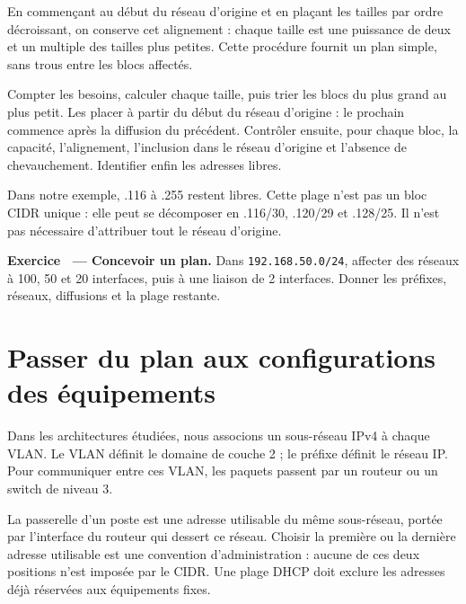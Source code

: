 \documentclass[11pt,a4paper]{article}
\newif\ifcorrige
\newcommand{\ip}[1]{\textcolor{ipred}{\texttt{#1}}}
\newcounter{exo}
\newcommand{\exo}[2]{%
  \Needspace{6cm}\stepcounter{exo}\begin{quest}\textbf{Exercice \theexo\ — #1.} #2\end{quest}}
\newcommand{\zone}[2]{%
  \ifcorrige
    \begin{tcolorbox}[colback=corrbg,colframe=corr,boxrule=0.6pt,arc=1pt,left=5pt,right=5pt,
      fontupper=\small\color{corr}]#2\end{tcolorbox}%
  \else
    \begin{tcolorbox}[colback=white,colframe=black!45,boxrule=0.5pt,arc=1pt,height=#1]\end{tcolorbox}%
  \fi}
\begin{document}
En commençant au début du réseau d'origine et en plaçant les tailles par ordre décroissant,
on conserve cet alignement : chaque taille est une puissance de deux et un multiple des tailles
plus petites. Cette procédure fournit un plan simple, sans trous entre les blocs affectés.

\begin{methode}
Compter les besoins, calculer chaque taille, puis trier les blocs du plus grand au plus petit.
Les placer à partir du début du réseau d'origine : le prochain commence après la diffusion du précédent.
Contrôler ensuite, pour chaque bloc, la capacité, l'alignement, l'inclusion dans le réseau d'origine
et l'absence de chevauchement. Identifier enfin les adresses libres.
\end{methode}
Dans notre exemple, .116 à .255 restent libres. Cette plage n'est pas un bloc CIDR unique :
elle peut se décomposer en .116/30, .120/29 et .128/25.
Il n'est pas nécessaire d'attribuer tout le réseau d'origine.

\exo{Concevoir un plan}{Dans \ip{192.168.50.0/24}, affecter des réseaux à
100, 50 et 20 interfaces, puis à une liaison de 2 interfaces.
Donner les préfixes, réseaux, diffusions et la plage restante.}
\zone{3.2cm}{Besoins triés : 100, 50, 20, 2. Tailles : 128, 64, 32, 4.
100 : \ip{192.168.50.0/25}, diffusion .127, 126 utilisables.
50 : \ip{192.168.50.128/26}, diffusion .191, 62 utilisables.
20 : \ip{192.168.50.192/27}, diffusion .223, 30 utilisables.
2 : \ip{192.168.50.224/30}, diffusion .227, 2 utilisables.
Plage restante : .228 à .255 ; décomposition possible en .228/30, .232/29 et .240/28.}

\Needspace{6cm}
\section{Passer du plan aux configurations des équipements}
Dans les architectures étudiées, nous associons un sous-réseau IPv4 à chaque VLAN.
Le VLAN définit le domaine de couche 2 ; le préfixe définit le réseau IP.
Pour communiquer entre ces VLAN, les paquets passent par un routeur ou un switch de niveau 3.

La passerelle d'un poste est une adresse utilisable du même sous-réseau, portée par l'interface
du routeur qui dessert ce réseau. Choisir la première ou la dernière adresse utilisable est
une convention d'administration : aucune de ces deux positions n'est imposée par le CIDR.
Une plage DHCP doit exclure les adresses déjà réservées aux équipements fixes.
\end{document}
